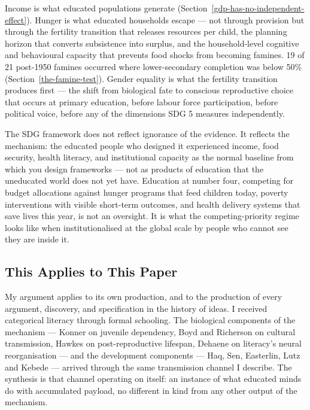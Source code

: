 \documentclass[12pt,letterpaper]{article}
\begin{document}
Income is what educated populations generate
(Section~\ref{gdp-has-no-independent-effect}). Hunger is what educated
households escape --- not through provision but through the fertility
transition that releases resources per child, the planning horizon that
converts subsistence into surplus, and the household-level cognitive and
behavioural capacity that prevents food shocks from becoming famines.
19 of 21 post-1950 famines occurred where lower-secondary completion
was below 50\% (Section~\ref{the-famine-test}). Gender equality
is what the fertility transition produces first --- the shift from
biological fate to conscious reproductive choice that occurs at primary
education, before labour force participation, before political voice,
before any of the dimensions SDG 5 measures independently.

The SDG framework does not reflect ignorance of the evidence. It reflects the
mechanism: the educated people who designed it experienced income, food
security, health literacy, and institutional capacity as the normal
baseline from which you design frameworks --- not as products of
education that the uneducated world does not yet have. Education at
number four, competing for budget allocations against hunger programs
that feed children today, poverty interventions with visible short-term
outcomes, and health delivery systems that save lives this year, is not
an oversight. It is what the competing-priority regime looks like when
institutionalised at the global scale by people who cannot see they are
inside it.

\subsection{This Applies to This Paper}\label{this-applies-to-this-paper}

My argument applies to its own production, and to the
production of every argument, discovery, and specification in the
history of ideas. I received categorical literacy through
formal schooling. The biological components of the mechanism --- Konner
on juvenile dependency, Boyd and Richerson on cultural transmission,
Hawkes on post-reproductive lifespan, Dehaene on literacy's neural
reorganisation --- and the development components --- Haq, Sen,
Easterlin, Lutz and Kebede --- arrived through the same transmission
channel I describe. The synthesis is that channel operating on
itself: an instance of what educated minds do with accumulated payload,
no different in kind from any other output of the mechanism.
\end{document}
